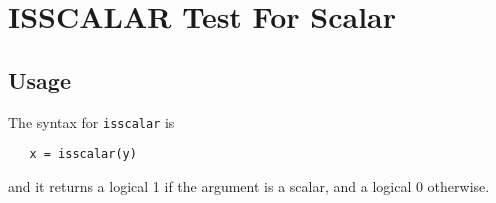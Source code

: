 \section{ISSCALAR Test For Scalar}

\subsection{Usage}

The syntax for \verb|isscalar| is
\begin{verbatim}
   x = isscalar(y)
\end{verbatim}
and it returns a logical 1 if the argument is a scalar,
 and a logical 0 otherwise.
